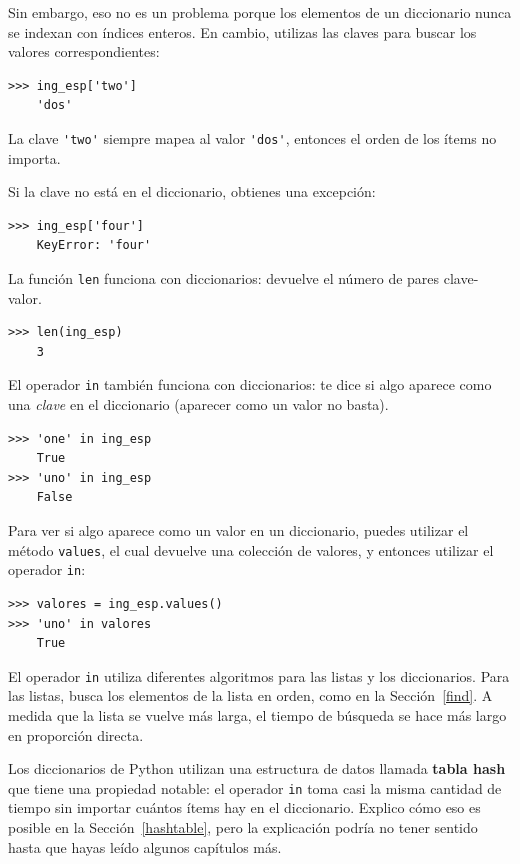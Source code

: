\documentclass[10pt]{book}
\begin{document}
Sin embargo, eso no es un problema porque
los elementos de un diccionario nunca se indexan con índices enteros.
En cambio, utilizas las claves para buscar los valores correspondientes:

\begin{verbatim}
>>> ing_esp['two']
    'dos'
\end{verbatim}
%
La clave \verb"'two'" siempre mapea al valor \verb"'dos'", entonces el orden
de los ítems no importa.

Si la clave no está en el diccionario, obtienes una excepción:

\begin{verbatim}
>>> ing_esp['four']
    KeyError: 'four'
\end{verbatim}
%
La función {\tt len} funciona con diccionarios: devuelve el
número de pares clave-valor.

\begin{verbatim}
>>> len(ing_esp)
    3
\end{verbatim}
%
El operador {\tt in} también funciona con diccionarios: te dice si
algo aparece como una {\em clave} en el diccionario (aparecer
como un valor no basta).

\begin{verbatim}
>>> 'one' in ing_esp
    True
>>> 'uno' in ing_esp
    False
\end{verbatim}
%
Para ver si algo aparece como un valor en un diccionario,
puedes utilizar el método {\tt values}, el cual devuelve una colección de
valores, y entonces utilizar el operador {\tt in}:

\begin{verbatim}
>>> valores = ing_esp.values()
>>> 'uno' in valores
    True
\end{verbatim}
%
El operador {\tt in} utiliza diferentes algoritmos para las listas y los
diccionarios.  Para las listas, busca los elementos de la lista en
orden, como en la Sección~\ref{find}.  A medida que la lista se vuelve más larga,
el tiempo de búsqueda se hace más largo en proporción directa.

Los diccionarios de Python utilizan una estructura de datos
llamada {\bf tabla hash} que tiene una propiedad notable: el
operador {\tt in} toma casi la misma cantidad de tiempo sin importar
cuántos ítems hay en el diccionario.  Explico cómo eso es posible
en la Sección~\ref{hashtable}, pero la explicación podría no tener
sentido hasta que hayas leído algunos capítulos más.
\end{document}
